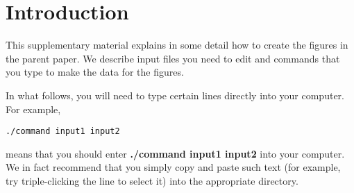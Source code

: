\section*{Introduction}

This supplementary material explains in some detail how to create the figures 
in the parent paper.  We describe input files you need to edit and commands 
that you type to make the data for the figures.

\hspace{4ex}In what follows, you will need to type certain lines directly into 
your computer.  For example,
\begin{verbatim}
./command input1 input2
\end{verbatim}
means that you should enter {\bf ./command input1 input2} into your computer.  
We in fact recommend that you simply copy and paste such text (for example, try 
triple-clicking the line to select it) into the appropriate directory.
